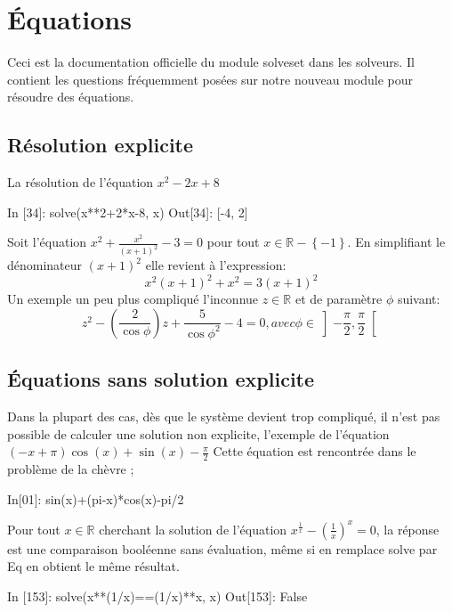 \section{Équations}
Ceci est la documentation officielle du module solveset dans les solveurs. Il contient les questions fréquemment posées sur notre nouveau module pour résoudre des équations.
 \subsection{Résolution explicite}
 La résolution de l’équation $x^{2}-2x+8$
 \begin{python}
In [34]: solve(x**2+2*x-8, x)                                                                     
Out[34]: [-4, 2]
\end{python}
Soit l'équation $x^{2} + \frac{x^{2}}{(x+1)^{2}} - 3 = 0$ pour tout $x \in \mathbb{R}-\left\lbrace -1 \right\rbrace $. En simplifiant le dénominateur $(x+1)^{2}$ elle revient à l'expression:
\[
x^{2}(x+1)^{2} + x^{2} = 3(x+1)^{2}
\]
Un exemple un peu plus compliqué l'inconnue $z \in \mathbb{R}$  et de paramètre  $\phi$ suivant:
\[
 z^{2} - (\frac{2}{\cos\phi})z + \frac{5}{\cos\phi^{2}}-4 = 0, avec \phi \in \left]-\frac{\pi}{2}, \frac{\pi}{2}\right[ 
\]
\begin{python}

\end{python}
 \subsection{Équations sans solution explicite}
Dans la plupart des cas, dès que le système devient trop compliqué, il n’est pas possible de calculer une 
solution non explicite, l'exemple de l’équation $\left(- x + \pi\right) \cos{\left (x \right )} + \sin{\left (x 
\right )} - \frac{\pi}{2}$ Cette équation est rencontrée dans le problème de la chèvre ;
\begin{python}
In[01]: sin(x)+(pi-x)*cos(x)-pi/2
\end{python}
Pour tout $x \in \mathbb{R}$ cherchant la solution de l’équation $x^{\frac{1}{x}} - (\frac{1}{x})^{x}=0$, la 
réponse est une comparaison booléenne sans évaluation, même si en remplace solve par Eq en obtient le même 
résultat.  
\begin{python}
In [153]: solve(x**(1/x)==(1/x)**x, x)
Out[153]: False
\end{python}
